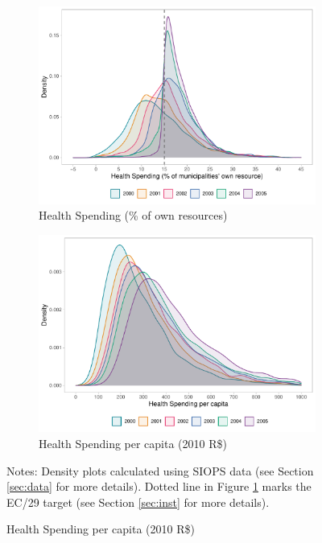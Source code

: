 \begin{figure}[h!]
    \begin{center}
    \caption{\footnotesize Spending Density Plots}\label{fig:density}
    \begin{subfigure}{0.48\textwidth}
        \caption{\scriptsize Health Spending (\% of own resources)}\label{fig:density_a}
        \centering
        \includegraphics[width=\textwidth]{plots/hist_ec29.pdf}
    \end{subfigure}
        \begin{subfigure}{0.48\textwidth}
        \caption{\scriptsize Health Spending per capita (2010 R\$)}\label{fig:density_b}
        \centering
        \includegraphics[width=\textwidth]{plots/hist_pc.pdf}
    \end{subfigure}
    \end{center}\vspace{+1pt}
    
    \scriptsize{Notes: Density plots calculated using SIOPS data (see Section \ref{sec:data} for more details). Dotted line in Figure \ref{fig:density_a} marks the EC/29 target (see Section \ref{sec:inst} for more details).}

\end{figure}